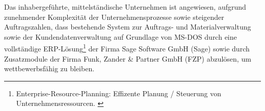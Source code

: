 Das inhabergeführte, mittelständische Unternehmen ist angewiesen, aufgrund zunehmender Komplexität der Unternehmensprozesse sowie steigender Auftragszahlen, dass bestehende System zur Auftrags- und Materialverwaltung sowie der Kundendatenverwaltung auf Grundlage von MS-DOS durch eine vollständige ERP-Lösung\footnote{\label{foot:1}Enterprise-Resource-Planning: Effizente Planung / Steuerung von Unternehmensressourcen. \cite{ERP}} der Firma Sage Software GmbH (Sage) sowie durch Zusatzmodule der Firma Funk, Zander \& Partner GmbH (FZP) abzulösen, um wettbewerbsfähig zu bleiben. \cite{einleitung1}